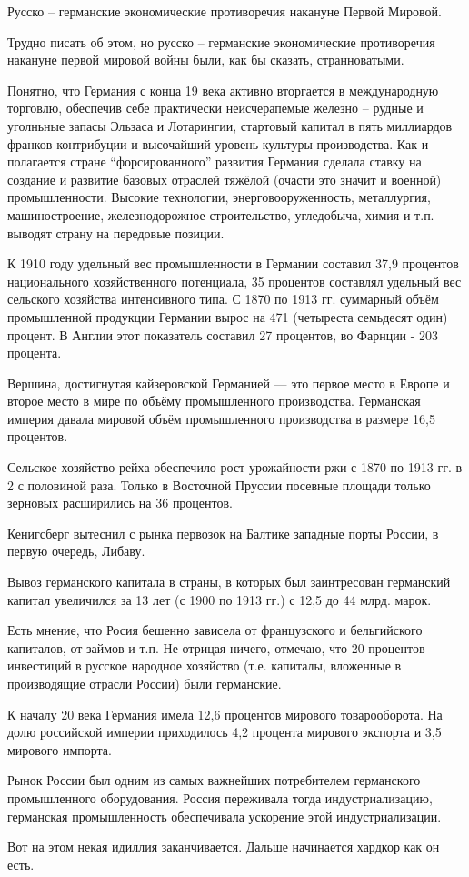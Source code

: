 Русско -- германские экономические противоречия накануне Первой Мировой.

Трудно писать об этом, но русско -- германские экономические противоречия
накануне первой мировой войны были, как бы сказать, странноватыми.

Понятно, что Германия с конца 19 века активно вторгается в международную
торговлю, обеспечив себе практически неисчерапемые железно -- рудные и уголньные
запасы Эльзаса и Лотарингии, стартовый капитал в пять миллиардов франков
контрибуции и высочайший уровень культуры производства. Как и полагается стране
\enquote{форсированного} развития Германия сделала ставку на создание и
развитие базовых отраслей тяжёлой (очасти это значит и военной) промышленности.
Высокие технологии, энерговооруженность, металлургия, машиностроение,
железнодорожное строительство, угледобыча, химия и т.п. выводят страну на
передовые позиции.

К 1910 году удельный вес промышленности в Германии составил 37,9 процентов
национального хозяйственного потенциала, 35 процентов составлял удельный вес
сельского хозяйства интенсивного типа. С 1870 по 1913 гг. суммарный объём
промышленной продукции Германии вырос на 471 (четыреста семьдесят один) процент.
В Англии этот показатель составил 27 процентов, во Фарнции - 203 процента.

Вершина, достигнутая кайзеровской Германией --- это первое место в Европе и
второе место в мире по объёму промышленного производства. Германская империя
давала мировой объём промышленного производства в размере 16,5 процентов.

Сельское хозяйство рейха обеспечило рост урожайности ржи с 1870 по 1913 гг. в 2
с половиной раза. Только в Восточной Пруссии посевные площади только зерновых
расширились на 36 процентов.

Кенигсберг вытеснил с рынка первозок на Балтике западные порты России, в первую
очередь, Либаву.

Вывоз германского капитала в страны, в которых был заинтресован германский
капитал увеличился за 13 лет (с 1900 по 1913 гг.) с 12,5 до 44 млрд. марок.

Есть мнение, что Росия бешенно зависела от французского и бельгийского
капиталов, от займов и т.п. Не отрицая ничего, отмечаю, что 20 процентов
инвестиций в русское народное хозяйство (т.е. капиталы, вложенные в производящие
отрасли России) были германские.

К началу 20 века Германия имела 12,6 процентов мирового товарооборота. На долю
российской империи приходилось 4,2 процента мирового экспорта и 3,5 мирового
импорта.

Рынок России был одним из самых важнейших потребителем германского промышленного
оборудования. Россия переживала тогда индустриализацию, германская
промышленность обеспечивала ускорение этой индустриализации.

Вот на этом некая идиллия заканчивается. Дальше начинается хардкор как он есть.
